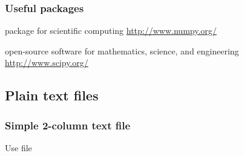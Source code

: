 \begin{frame}
\frametitle{Useful packages}

\begin{description}
\item<1->[NumPy:] package for scientific computing \url{http://www.numpy.org/}
\item<2->[SciPy:] open-source software for mathematics, science, and engineering \url{http://www.scipy.org/}

\end{description}
\end{frame}

\subsection{Plain text files}
\begin{frame}[fragile]
\frametitle{Simple 2-column text file}
Use file 

\end{frame}


